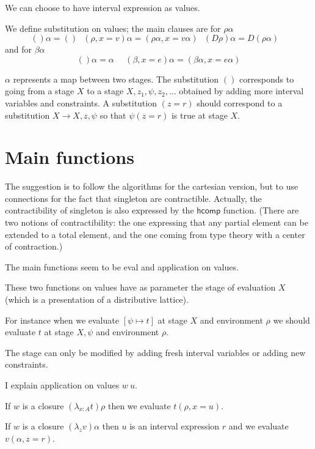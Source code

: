 \documentclass[10pt,a4paper]{article}
\newcommand{\hcomp}{\mathsf{hcomp}}
\begin{document}
 We can choose to have interval expression as values.

 We define substitution on values; the main clauses are for $\rho\alpha$
$$
 ()\alpha  = ()~~~(\rho,x=v)\alpha = (\rho\alpha, x = v\alpha)~~~(D\rho)\alpha = D(\rho\alpha)~~~~
$$
and for $\beta\alpha$
$$
()\alpha = \alpha~~~~~~(\beta,x=e)\alpha = (\beta\alpha, x = e\alpha)
$$

$\alpha$ represents a map between two stages. The substitution $()$ corresponds to going from a
stage $X$ to a stage $X,z_1,\psi,z_2,\dots$ obtained by adding more interval variables and constraints.
A substitution $(z=r)$ should correspond to a substitution $X\rightarrow X,z,\psi$ so that
$\psi(z=r)$ is true at stage $X$.

\section*{Main functions}

The suggestion is to follow the algorithms for the cartesian version, but to use connections
for the fact that singleton are contractible. Actually, the contractibility of singleton is
also expressed by the $\hcomp$ function.
(There are two notions of contractibility: the one expressing that any partial element can be
extended to a total element, and the one coming from type theory with a center of contraction.)

 The main functions seem to be eval and application on values.

\medskip

These two functions on values have as parameter the stage of evaluation $X$ (which is a
presentation of a distributive lattice). 

\medskip

For instance when we evaluate $[\psi\mapsto t]$ at stage $X$ and environment $\rho$
we should evaluate $t$ at stage $X,\psi$ and environment $\rho$.


The stage can only be modified by adding fresh interval variables or adding new constraints.

\medskip

I explain application on values $w~u$.

If $w$ is a closure $(\lambda_{x:A}t)\rho$ then we evaluate $t(\rho,x=u)$.

If $w$ is a closure $(\lambda_zv)\alpha$ then $u$ is an interval expression $r$ and we evaluate
$v(\alpha,z=r)$.
\end{document}
